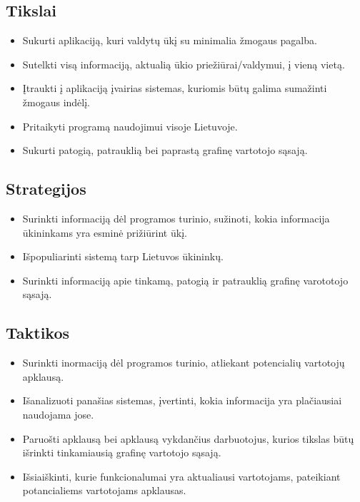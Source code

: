 \documentclass[oneside]{VUMIFPSkursinis}
\begin{document}
\subsection{Tikslai}
\begin{itemize}
\item Sukurti aplikaciją, kuri valdytų ūkį su minimalia žmogaus pagalba.
\item Sutelkti visą informaciją, aktualią ūkio priežiūrai/valdymui, į vieną vietą.
\item Įtraukti į aplikaciją įvairias sistemas, kuriomis būtų galima sumažinti žmogaus indėlį.
\item Pritaikyti programą naudojimui visoje Lietuvoje.
\item Sukurti patogią, patrauklią bei paprastą grafinę vartotojo sąsają.
\end{itemize}
\subsection{Strategijos}
\begin{itemize}
\item Surinkti informaciją dėl programos turinio, sužinoti, kokia informacija ūkininkams yra esminė prižiūrint ūkį.
\item Išpopuliarinti sistemą tarp Lietuvos ūkininkų.
\item Surinkti informaciją apie tinkamą, patogią ir patrauklią grafinę varototojo sąsają.
\end{itemize}
\subsection{Taktikos}
\begin{itemize}
\item Surinkti inormaciją dėl programos turinio, atliekant potencialių vartotojų apklausą.
\item Išanalizuoti panašias sistemas, įvertinti, kokia informacija yra plačiausiai naudojama jose.
\item Paruošti apklausą bei apklausą vykdančius darbuotojus, kurios tikslas būtų išrinkti tinkamiausią grafinę vartotojo sąsają.
\item Išsiaiškinti, kurie funkcionalumai yra aktualiausi vartotojams, pateikiant potancialiems vartotojams apklausas.
\end{itemize}
\end{document}
